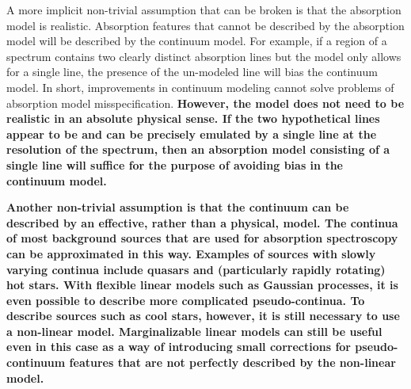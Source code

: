 \documentclass[manuscript]{aastex62}
\begin{document}
A more implicit non-trivial assumption that can be broken is that the absorption model is realistic.
Absorption features that cannot be described by the absorption model will be described by the continuum model.
For example, if a region of a spectrum contains two clearly distinct absorption lines but the model only allows for a single line, the presence of the un-modeled line will bias the continuum model.
In short, improvements in continuum modeling cannot solve problems of absorption model misspecification.
{\bf
However, the model does not need to be realistic in an absolute physical sense.
If the two hypothetical lines appear to be and can be precisely emulated by a single line at the resolution of the spectrum, then an absorption model consisting of a single line will suffice for the purpose of avoiding bias in the continuum model.
}

{\bf
Another non-trivial assumption is that the continuum can be described by an effective, rather than a physical, model.
The continua of most background sources that are used for absorption spectroscopy can be approximated in this way.
Examples of sources with slowly varying continua include quasars and (particularly rapidly rotating) hot stars.
With flexible linear models such as Gaussian processes, it is even possible to describe more complicated pseudo-continua.
To describe sources such as cool stars, however, it is still necessary to use a non-linear model.
Marginalizable linear models can still be useful even in this case as a way of introducing small corrections for pseudo-continuum features that are not perfectly described by the non-linear model.
}
\end{document}
